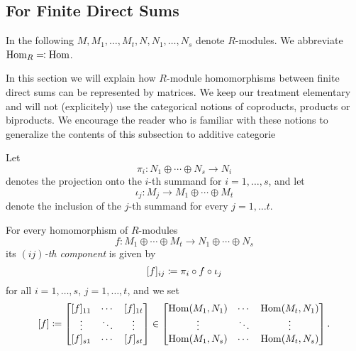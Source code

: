 \subsection{For Finite Direct Sums}


\begin{conventions}
  In the following $M, M_1, \dotsc, M_t, N, N_1, \dotsc, N_s$ denote $R$-modules.
  We abbreviate $\operatorname{Hom}_R \eqqcolon \operatorname{Hom}$.
\end{conventions}


\begin{fluff}
  In this section we will explain how $R$-module homomorphisms between finite direct sums can be represented  by matrices.
  We keep our treatment elementary and will not (explicitely) use the categorical notions of coproducts, products or biproducts.
  We encourage the reader who is familiar with these notions to generalize the contents of this subsection to additive categorie
\end{fluff}


\begin{fluff}
  Let
  \[
          \pi_i
  \colon  N_1 \oplus \dotsb \oplus N_s
  \to     N_i
  \]
  denotes the projection onto the $i$-th summand for $i = 1, \dotsc, s$, and let
  \[
            \iota_j
    \colon  M_j
    \to     M_1 \oplus \dotsb \oplus M_t
  \]
  denote the inclusion of the $j$-th summand for every $j = 1, \dotsc t$.
\end{fluff}


\begin{definition}
  For every homomorphism of $R$-modules
  \[
            f
    \colon  M_1 \oplus \dotsb \oplus M_t
    \to     N_1 \oplus \dotsb \oplus N_s
  \]
  its \emph{$(ij)$-th component} is given by
  \[
              [f]_{ij}
    \coloneqq  \pi_i \circ f \circ \iota_j
  \]
  for all $i = 1, \dotsc, s$, $j = 1, \dotsc, t$, and we set
  \[
              [f]
    \coloneqq  \begin{bmatrix}
                [f]_{11}  & \cdots  & [f]_{1t}  \\
                \vdots    & \ddots  & \vdots    \\
                [f]_{s1}  & \cdots  & [f]_{st}
              \end{bmatrix}
    \in       \begin{bmatrix}
                \operatorname{Hom}(M_1, N_1)  & \cdots  & \operatorname{Hom}(M_t, N_1)  \\
                \vdots          & \ddots  & \vdots          \\
                \operatorname{Hom}(M_1, N_s)  & \cdots  & \operatorname{Hom}(M_t, N_s)
              \end{bmatrix}.
  \]
\end{definition}


